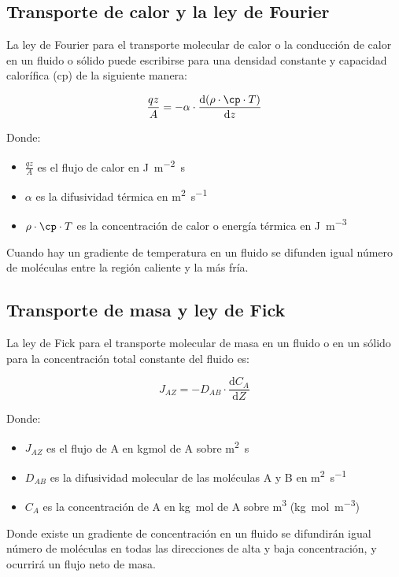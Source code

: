 \documentclass{AsignaturaResumen}
\begin{document}
\subsection{Transporte de calor y la ley de Fourier}

La ley de Fourier para el transporte molecular de calor o la conducción de calor en un fluido o sólido puede escribirse para una densidad constante y capacidad calorífica (cp) de la siguiente manera:

\begin{equation}
    \frac{qz}{A} = -\alpha \cdot \frac{\mathrm{d}(\rho \cdot \unit{\cp} \cdot T)}{\mathrm{d}z}
\end{equation}

Donde:

\begin{itemize}
    \item $\frac{qz}{A}$ es el flujo de calor en \unit{\joule\per\m\squared\s}
    \item $\alpha$ es la difusividad térmica en \unit{\m\squared\per\s}
    \item $\rho \cdot \unit{\cp} \cdot T$ es la concentración de calor o energía térmica en \unit{\joule\per\m\cubed}
\end{itemize}

Cuando hay un gradiente de temperatura en un fluido se difunden igual número de moléculas entre la región caliente y la más fría.

\subsection{Transporte de masa y ley de Fick}

La ley de Fick para el transporte molecular de masa en un fluido o en un sólido para la concentración total constante del fluido es:

\begin{equation}
    J_{AZ} = -D_{AB} \cdot \frac{\mathrm{d}C_{A}}{\mathrm{d}Z}
\end{equation}

Donde:

\begin{itemize}
    \item $J_{AZ}$ es el flujo de A en kgmol de A sobre \unit{\m\squared\s}
    \item $D_{AB}$ es la difusividad molecular de las moléculas A y B en \unit{\m\squared\per\s}
    \item $C_{A}$ es la concentración de A en \unit{\kg\mole} de A sobre \unit{\m\cubed} (\unit{\kg\mole\per\m\cubed})
\end{itemize}

Donde existe un gradiente de concentración en un fluido se difundirán igual número de moléculas en todas las direcciones de alta y baja concentración, y ocurrirá un flujo neto de masa.



\ifx\ISMAIN\undefined
    
\end{document}
